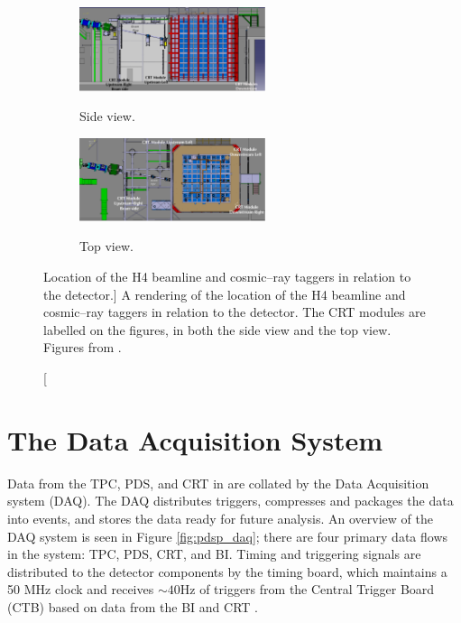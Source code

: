 \begin{figure}

	\centering

	\begin{subfigure}[b]{\textwidth}
		\centering
		\includegraphics[width=0.6\textwidth]{figures/crt_side.pdf}
		\label{fig:crt_side}
		\caption{Side view.}
	\end{subfigure}

	\vspace{3mm}

	\begin{subfigure}[b]{\textwidth}
		\centering
		\includegraphics[width=0.6\textwidth]{figures/crt_top.pdf}
		\label{fig:crt_top}
		\caption{Top view.}
	\end{subfigure}

	\caption
	[Location of the H4 beamline and cosmic--ray taggers in relation to the
	\protodune{} detector.]
	{A rendering of the location of the H4 beamline and cosmic--ray taggers in 
	relation to the \protodune{} detector. The CRT modules are labelled on the
	figures, in both the side view and the top view. Figures from 
	\cite{protoduneperf}.}

	\label{fig:pdsp_CRT}

\end{figure}

\section{The Data Acquisition System}

Data from the TPC, PDS, and CRT in \protodune{} are collated by the Data 
Acquisition system (DAQ). The DAQ distributes triggers, compresses and packages 
the data into events, and stores the data ready for future analysis. 
An overview of the \protodune{} DAQ system is seen in Figure 
\ref{fig:pdsp_daq}; there are four primary data flows in the system: TPC, PDS, 
CRT, and BI. Timing and triggering signals are distributed to the detector 
components by the timing board, which maintains a 50 MHz clock and receives 
$\sim 40 \mbox{Hz}$ of triggers from the Central Trigger Board (CTB) based on 
data from the BI and CRT \cite{Abi2017}.

